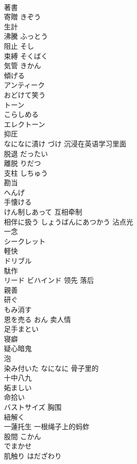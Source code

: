 \documentclass[8pt]{extreport}
\begin{document}
\begin{CJK}{UTF8}{min}
\\	著書	
\\	寄贈	きぞう
\\	生計	
\\	沸騰	ふっとう
\\	阻止	そし
\\	束縛	そくばく
\\	気管	きかん
\\	傾げる	
\\	アンティーク	
\\	おどけて笑う	
\\	トーン	
\\	こらしめる	
\\	エレクトーン	
\\	抑圧	
\\	なになに漬け	づけ 沉浸在英语学习里面
\\	脱退	だったい
\\	離脱	りだつ
\\	支柱	しちゅう
\\	勘当	
\\	へんげ	
\\	手懐ける	
\\	けん制しあって	互相牵制
\\	相伴に扱う	しょうばんにあつかう 沾点光
\\	一念	
\\	シークレット	
\\	軽快	
\\	ドリブル	
\\	駄作	
\\	リード ビハインド	领先 落后
\\	親善	
\\	研ぐ	
\\	もみ消す	
\\	恩を売る	おん 卖人情
\\	足手まとい	
\\	寝癖	
\\	疑心暗鬼	
\\	泡	
\\	染み付いた なになに	骨子里的
\\	十中八九	
\\	妬ましい	
\\	命拾い	
\\	バストサイズ	胸围
\\	紐解く	
\\	一蓮托生	一根绳子上的蚂蚱
\\	股間	こかん
\\	でまかせ	
\\	肌触り	はだざわり 

\end{CJK}
\end{document}
